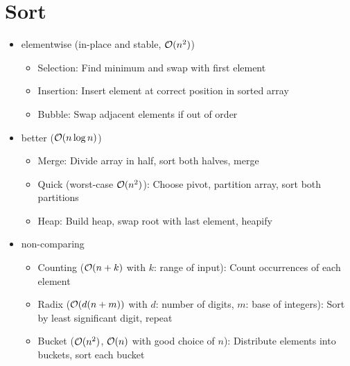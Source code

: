 \documentclass{article}
\begin{document}
\section{Sort}
\begin{itemize}
  \item elementwise (in-place and stable, $\mathcal{O}(n^2)$)
        \begin{itemize}
          \item Selection: Find minimum and swap with first element
          \item Insertion: Insert element at correct position in sorted array
          \item Bubble: Swap adjacent elements if out of order
        \end{itemize}
  \item better ($\mathcal{O}(n\log n)$)
        \begin{itemize}
          \item Merge: Divide array in half, sort both halves, merge
          \item Quick (worst-case $\mathcal{O}(n^2)$): Choose pivot, partition array, sort both partitions
          \item Heap: Build heap, swap root with last element, heapify
        \end{itemize}
  \item non-comparing
        \begin{itemize}
          \item Counting ($\mathcal{O}(n+k)$ with $k$: range of input): Count occurrences of each element
          \item Radix ($\mathcal{O}(d(n+m))$ with $d$: number of digits, $m$: base of integers): Sort by least significant digit, repeat
          \item Bucket ($\mathcal{O}(n^2)$, $\mathcal{O}(n)$ with good choice of $n$): Distribute elements into buckets, sort each bucket
        \end{itemize}
\end{itemize}
\end{document}
